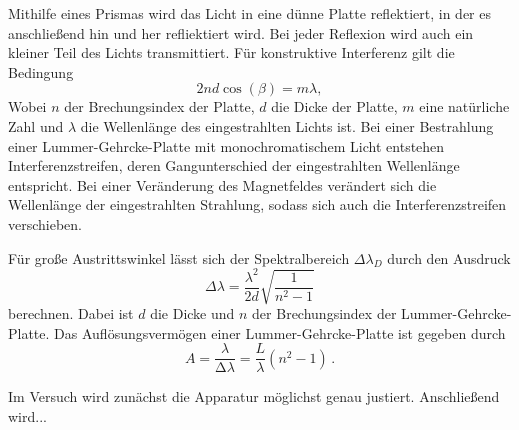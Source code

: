 Mithilfe eines Prismas wird das Licht in eine dünne Platte reflektiert, in der
es anschließend hin und her refliektiert wird. Bei jeder Reflexion wird auch ein kleiner
Teil des Lichts transmittiert. Für konstruktive Interferenz gilt die Bedingung
\begin{equation}
  2n d \cos(\beta)=m \lambda,
\end{equation}
Wobei $n$ der Brechungsindex der Platte, $d$ die Dicke der Platte, $m$ eine natürliche
Zahl und $\lambda$ die Wellenlänge des eingestrahlten Lichts ist. Bei einer Bestrahlung einer
Lummer-Gehrcke-Platte mit monochromatischem Licht entstehen Interferenzstreifen, deren
Gangunterschied der eingestrahlten Wellenlänge entspricht. Bei einer Veränderung
des Magnetfeldes verändert sich die Wellenlänge der eingestrahlten Strahlung, sodass
sich auch die Interferenzstreifen verschieben.

Für große Austrittswinkel lässt sich der Spektralbereich $\Delta \lambda_D$ durch
den Ausdruck
\begin{equation}
   \Delta \lambda = \frac{\lambda^2}{2d} \sqrt{\frac{1}{n^2-1}}
\end{equation}
berechnen. Dabei ist $d$ die Dicke und $n$ der Brechungsindex der Lummer-Gehrcke-Platte.
Das Auflösungsvermögen einer Lummer-Gehrcke-Platte ist gegeben durch
\begin{equation}
  A = \frac{\lambda}{\increment \lambda} = \frac{L}{\lambda}(n^2-1) \,.
\end{equation}

Im Versuch wird zunächst die Apparatur möglichst genau justiert. Anschließend wird...
